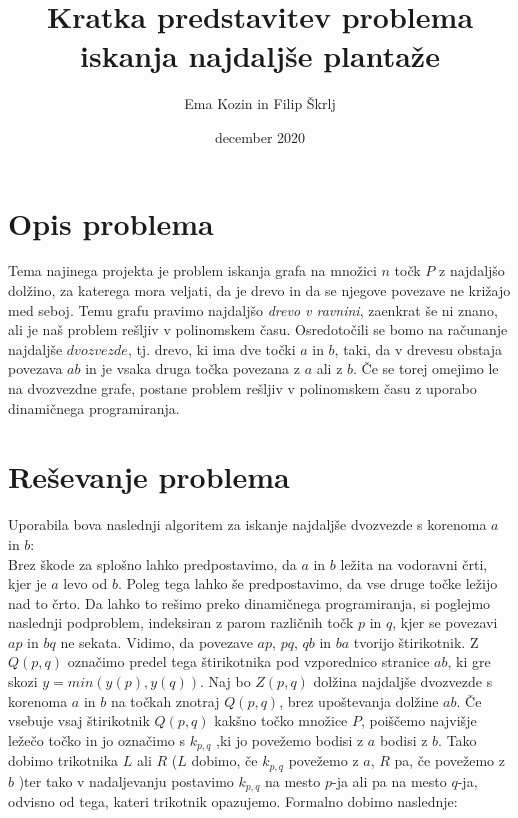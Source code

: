 \documentclass[a4paper,12pt]{article}
\title{Kratka predstavitev problema iskanja najdaljše plantaže}
\author{Ema Kozin in Filip Škrlj}
\date{december 2020}
\begin{document}
\maketitle

\newpage
\section{Opis problema}

Tema najinega projekta je problem iskanja grafa na množici $n$ točk $P$ z najdaljšo dolžino, za katerega mora veljati, da je drevo in da se njegove povezave ne križajo med seboj. Temu grafu pravimo najdaljšo \emph{drevo v ravnini}, zaenkrat še ni znano, ali je naš problem rešljiv v polinomskem času.
Osredotočili se bomo na računanje najdaljše $dvozvezde$, tj. drevo, ki ima dve točki $a$ in $b$, taki, da v drevesu obstaja povezava $ab$ in je vsaka druga točka povezana z $a$ ali z $b$. Če se torej omejimo le na dvozvezdne grafe, postane problem rešljiv v polinomskem času z uporabo dinamičnega programiranja.



\section{Reševanje problema}
Uporabila bova naslednji algoritem za iskanje najdaljše dvozvezde s korenoma $a$ in $b$: \\
Brez škode za splošno lahko predpostavimo, da $a$ in $b$ ležita na vodoravni črti, kjer je $a$ levo od $b$. Poleg tega lahko še predpostavimo, da vse druge točke ležijo nad to črto. Da lahko to rešimo preko dinamičnega programiranja, si poglejmo naslednji podproblem, indeksiran z parom različnih točk $p$ in $q$, kjer se povezavi $ap$ in $bq$ ne sekata. Vidimo, da povezave $ap$, $pq$, $qb$ in $ba$ tvorijo štirikotnik. Z $Q(p,q)$ označimo predel tega štirikotnika pod vzporednico stranice $ab$, ki gre skozi $y = min(y(p),y(q))$.
Naj bo $Z(p,q)$ dolžina najdaljše dvozvezde s korenoma $a$ in $b$ na točkah znotraj $Q(p,q)$, brez upoštevanja dolžine $ab$. Če vsebuje vsaj štirikotnik $Q(p,q)$ kakšno točko množice $P$, poiščemo najvišje ležečo točko in jo označimo s $k_{p,q}$ ,ki jo povežemo bodisi z $a$ bodisi z $b$. Tako dobimo  trikotnika $L$ ali $R$ ($L$ dobimo, če $k_{p,q}$ povežemo z $a$, $R$ pa, če povežemo z $b$ )ter tako v nadaljevanju postavimo $k_{p,q}$ na mesto $p$-ja ali pa na mesto $q$-ja, odvisno od tega, kateri trikotnik opazujemo. Formalno dobimo naslednje: \\
\end{document}
